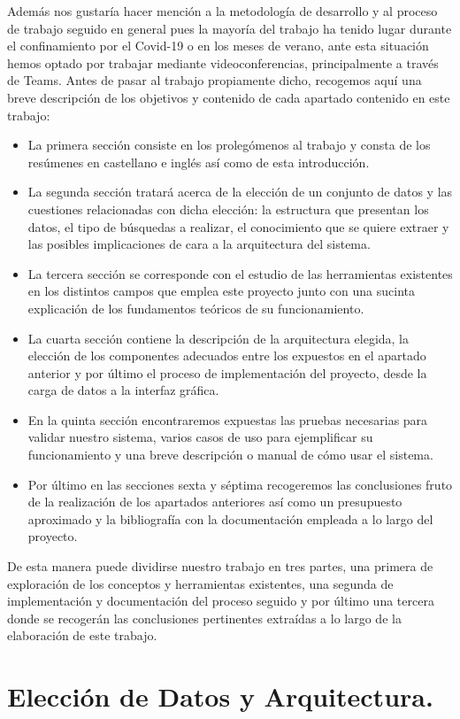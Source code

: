 \documentclass[11pt, a4paper]{article} %
\begin{document}
Además nos gustaría hacer mención a la metodología de desarrollo y al proceso de trabajo seguido en general pues la mayoría del trabajo ha tenido lugar durante el confinamiento por el Covid-19 o en los meses de verano, ante esta situación hemos optado por trabajar mediante videoconferencias, principalmente a través de Teams. Antes de pasar al trabajo propiamente dicho, recogemos aquí una breve descripción de los objetivos y contenido de cada apartado contenido en este trabajo:
\begin{itemize}
\item La primera sección consiste en los prolegómenos al trabajo y consta de los resúmenes en castellano e inglés así como de esta introducción.
\item La segunda sección tratará acerca de la elección de un conjunto de datos y las cuestiones relacionadas con dicha elección: la estructura que presentan los datos, el tipo de búsquedas a realizar, el conocimiento que se quiere extraer y las posibles implicaciones de cara a la arquitectura del sistema.
\item La tercera sección se corresponde con el estudio de las herramientas existentes en los distintos campos que emplea este proyecto junto con una sucinta explicación de los fundamentos teóricos de su funcionamiento.
\item La cuarta sección contiene la descripción de la arquitectura elegida, la elección de los componentes adecuados entre los expuestos en el apartado anterior y por último el proceso de implementación del proyecto, desde la carga de datos a la interfaz gráfica.
\item En la quinta sección encontraremos expuestas las pruebas necesarias para validar nuestro sistema, varios casos de uso para ejemplificar su funcionamiento y una breve descripción o manual de cómo usar el sistema.
\item Por último en las secciones sexta y séptima recogeremos las conclusiones fruto de la realización de los apartados anteriores así como un presupuesto aproximado y la bibliografía con la documentación empleada a lo largo del proyecto.
\end{itemize}
De esta manera puede dividirse nuestro trabajo en tres partes, una primera de exploración de los conceptos y herramientas existentes, una segunda de implementación y documentación del proceso seguido y por último una tercera 
donde se recogerán las conclusiones pertinentes extraídas a lo largo de la elaboración de este trabajo.
\newpage
\section{Elección de Datos y Arquitectura.}
\end{document}
